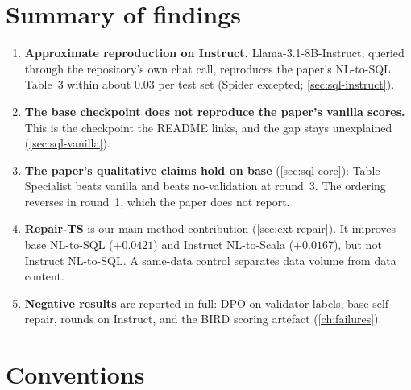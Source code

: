 \section{Summary of findings}

\begin{enumerate}
\item \textbf{Approximate reproduction on Instruct.} Llama-3.1-8B-Instruct, queried through the repository's own chat
call, reproduces the paper's NL-to-SQL Table~3 within about 0.03 per test set (Spider excepted;
\cref{sec:sql-instruct}).
\item \textbf{The base checkpoint does not reproduce the paper's vanilla scores.} This is the checkpoint the README
links, and the gap stays unexplained (\cref{sec:sql-vanilla}).
\item \textbf{The paper's qualitative claims hold on base} (\cref{sec:sql-core}): Table-Specialist beats vanilla and
beats no-validation at round~3. The ordering reverses in round~1, which the paper does not report.
\item \textbf{Repair-TS} is our main method contribution (\cref{sec:ext-repair}). It improves base NL-to-SQL
($+0.0421$) and Instruct NL-to-Scala ($+0.0167$), but not Instruct NL-to-SQL. A same-data control separates data
volume from data content.
\item \textbf{Negative results} are reported in full: DPO on validator labels, base self-repair, rounds on Instruct,
and the BIRD scoring artefact (\cref{ch:failures}).
\end{enumerate}

\section{Conventions}\label{sec:conventions}


